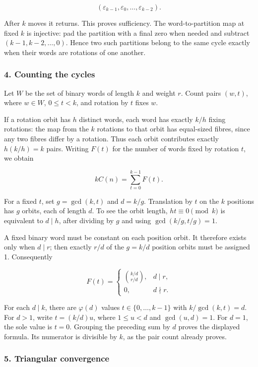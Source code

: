 \documentclass[11pt,a4paper]{article}
\begin{document}
\[
(\varepsilon_{k-1},\varepsilon_0,\ldots,\varepsilon_{k-2}).
\]

After \(k\) moves it returns. This proves sufficiency. The word-to-partition map at fixed \(k\) is injective: pad the partition with a final zero when needed and subtract \((k-1,k-2,\ldots,0)\). Hence two such partitions belong to the same cycle exactly when their words are rotations of one another.

\subsubsection{4. Counting the cycles}\label{counting-the-cycles}

Let \(W\) be the set of binary words of length \(k\) and weight \(r\). Count pairs \((w,t)\), where \(w\in W\), \(0\le t<k\), and rotation by \(t\) fixes \(w\).

If a rotation orbit has \(h\) distinct words, each word has exactly \(k/h\) fixing rotations: the map from the \(k\) rotations to that orbit has equal-sized fibres, since any two fibres differ by a rotation. Thus each orbit contributes exactly \(h(k/h)=k\) pairs. Writing \(F(t)\) for the number of words fixed by rotation \(t\), we obtain

\[
kC(n)=\sum_{t=0}^{k-1}F(t).
\]

For a fixed \(t\), set \(g=\gcd(k,t)\) and \(d=k/g\). Translation by \(t\) on the \(k\) positions has \(g\) orbits, each of length \(d\). To see the orbit length, \(ht\equiv0\pmod k\) is equivalent to \(d\mid h\), after dividing by \(g\) and using \(\gcd(k/g,t/g)=1\).

A fixed binary word must be constant on each position orbit. It therefore exists only when \(d\mid r\); then exactly \(r/d\) of the \(g=k/d\) position orbits must be assigned 1. Consequently

\[
F(t)=\begin{cases}
\binom{k/d}{r/d},&d\mid r,\\
0,&d\nmid r.
\end{cases}
\]

For each \(d\mid k\), there are \(\varphi(d)\) values \(t\in\{0,\ldots,k-1\}\) with \(k/\gcd(k,t)=d\). For \(d>1\), write \(t=(k/d)u\), where \(1\le u<d\) and \(\gcd(u,d)=1\). For \(d=1\), the sole value is \(t=0\). Grouping the preceding sum by \(d\) proves the displayed formula. Its numerator is divisible by \(k\), as the pair count already proves.

\subsubsection{5. Triangular convergence}\label{triangular-convergence}
\end{document}
